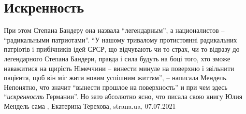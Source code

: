  
 
 
 
 
\chapter{Искренность}

При этом Степана Бандеру она назвала \enquote{легендарным}, а националистов –
\enquote{радикальными патриотами}.  \enquote{У нашому тривалому протистоянні
радикальних патріотів і прибічників ідей СРСР, що відчувають чи то страх, чи то
відразу до легендарного Степана Бандери, правда і сила будуть на боці того, хто
зможе наважитися на щирість Німеччини – винести минуле на поверхню і звільнити
пацієнта, щоб він міг жити новим успішним життям}, – написала Мендель.
Непонятно, что значит \enquote{вынести прошлое на поверхность} и при чем здесь
\enquote{\emph{искренность} Германии}. Но зато абсолютно ясно, что писала свою
книгу Юлия Мендель сама
, 
Екатерина Терехова, strana.ua, 07.07.2021

